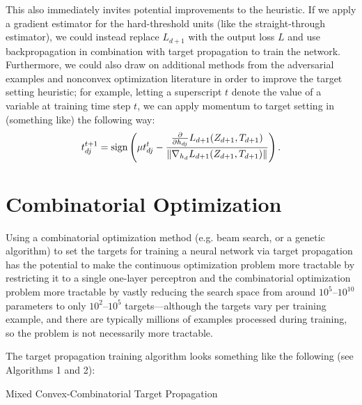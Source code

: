 \documentclass[12pt,letterpaper]{article}
\begin{document}
This also immediately invites potential improvements to the heuristic. If we apply a gradient estimator for the hard-threshold units (like the straight-through estimator), we could instead replace $L_{d+1}$ with the output loss $L$ and use backpropagation in combination with target propagation to train the network. Furthermore, we could also draw on additional methods from the adversarial examples and nonconvex optimization literature in order to improve the target setting heuristic; for example, letting a superscript $t$ denote the value of a variable at training time step $t$, we can apply momentum to target setting in (something like) the following way:
$$t_{dj}^{t+1} = \textrm{sign}\left(\mu t_{dj}^{t} - {{\partial \over \partial h_{dj}}L_{d+1}(Z_{d+1}, T_{d+1}) \over \Vert \nabla_{h_{d}}L_{d+1}(Z_{d+1}, T_{d+1}) \Vert}\right).$$



\section{Combinatorial Optimization}

Using a combinatorial optimization method (e.g. beam search, or a genetic algorithm) to set the targets for training a neural network via target propagation has the potential to make the continuous optimization problem more tractable by restricting it to a single one-layer perceptron and the combinatorial optimization problem more tractable by vastly reducing the search space from around $10^{5}$--$10^{10}$ parameters to only $10^{2}$--$10^{5}$ targets---although the targets vary per training example, and there are typically millions of examples processed during training, so the problem is not necessarily more tractable. 

The target propagation training algorithm looks something like the following (see Algorithms 1 and 2):

\begin{algorithm}
\caption{Mixed Convex-Combinatorial Target Propagation}
\begin{algorithmic}  
\ENDFOR
{}
\ENDFOR
\ENDFOR
\end{algorithmic}
\end{algorithm} 
\end{document}
